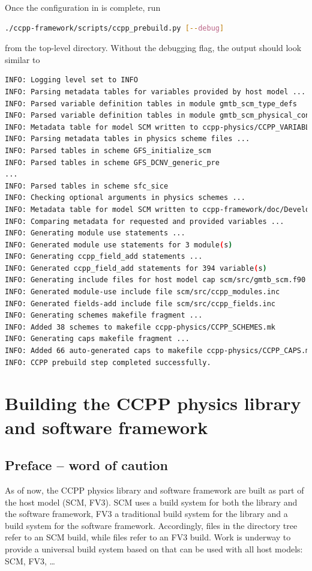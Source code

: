 Once the configuration in  is complete, run
\begin{lstlisting}[language=bash]
./ccpp-framework/scripts/ccpp_prebuild.py [--debug]
\end{lstlisting}
from the top-level directory. Without the debugging flag, the output should look similar to
\begin{lstlisting}[language=bash,basicstyle=\scriptsize\ttfamily]
INFO: Logging level set to INFO
INFO: Parsing metadata tables for variables provided by host model ...
INFO: Parsed variable definition tables in module gmtb_scm_type_defs
INFO: Parsed variable definition tables in module gmtb_scm_physical_constants
INFO: Metadata table for model SCM written to ccpp-physics/CCPP_VARIABLES.html
INFO: Parsing metadata tables in physics scheme files ...
INFO: Parsed tables in scheme GFS_initialize_scm
INFO: Parsed tables in scheme GFS_DCNV_generic_pre
...
INFO: Parsed tables in scheme sfc_sice
INFO: Checking optional arguments in physics schemes ...
INFO: Metadata table for model SCM written to ccpp-framework/doc/DevelopersGuide/CCPP_VARIABLES.tex
INFO: Comparing metadata for requested and provided variables ...
INFO: Generating module use statements ...
INFO: Generated module use statements for 3 module(s)
INFO: Generating ccpp_field_add statements ...
INFO: Generated ccpp_field_add statements for 394 variable(s)
INFO: Generating include files for host model cap scm/src/gmtb_scm.f90 ...
INFO: Generated module-use include file scm/src/ccpp_modules.inc
INFO: Generated fields-add include file scm/src/ccpp_fields.inc
INFO: Generating schemes makefile fragment ...
INFO: Added 38 schemes to makefile ccpp-physics/CCPP_SCHEMES.mk
INFO: Generating caps makefile fragment ...
INFO: Added 66 auto-generated caps to makefile ccpp-physics/CCPP_CAPS.mk
INFO: CCPP prebuild step completed successfully.
\end{lstlisting}

\section{Building the CCPP physics library and software framework}
\label{sec_ccpp_build}
\subsection{Preface -- word of caution}
As of now, the CCPP physics library and software framework are built as part of the host model (SCM, FV3). SCM uses a  build system for both the library and the software framework, FV3 a traditional  build system for the library and a  build system for the software framework. Accordingly,  files in the  directory tree refer to an SCM build, while  files refer to an FV3 build. Work is underway to provide a universal build system based on  that can be used with all host models: SCM, FV3, \dots

